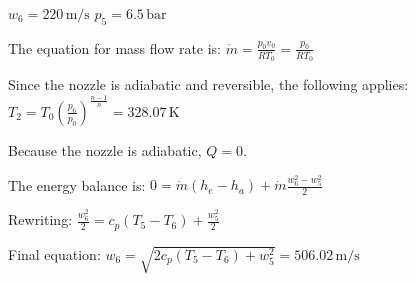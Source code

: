 \( w_6 = 220 \, \text{m/s} \)  
\( p_5 = 6.5 \, \text{bar} \)  

The equation for mass flow rate is:  
\( \dot{m} = \frac{p_0 v_0}{R T_0} = \frac{p_0}{R T_0} \)  

Since the nozzle is adiabatic and reversible, the following applies:  
\( T_2 = T_0 \left( \frac{p_6}{p_0} \right)^{\frac{n-1}{n}} = 328.07 \, \text{K} \)  

Because the nozzle is adiabatic, \( Q = 0 \).  

The energy balance is:  
\( 0 = \dot{m} (h_e - h_a) + \dot{m} \frac{w_6^2 - w_5^2}{2} \)  

Rewriting:  
\( \frac{w_6^2}{2} = c_p (T_5 - T_6) + \frac{w_5^2}{2} \)  

Final equation:  
\( w_6 = \sqrt{2 c_p (T_5 - T_6) + w_5^2} = 506.02 \, \text{m/s} \)